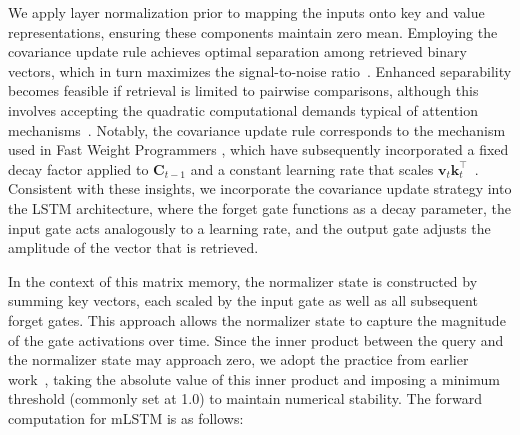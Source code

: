 We apply layer normalization prior to mapping the inputs onto key and value representations, ensuring these components maintain zero mean. Employing the covariance update rule achieves optimal separation among retrieved binary vectors, which in turn maximizes the signal-to-noise ratio~\citep{Dayan:91}. Enhanced separability becomes feasible if retrieval is limited to pairwise comparisons, although this involves accepting the quadratic computational demands typical of attention mechanisms~\citep{Krotov:16,Krotov:17,Ramsauer:21}. Notably, the covariance update rule corresponds to the mechanism used in Fast Weight Programmers \citep{Schmidhuber:92ncfastweights,Schlag:21}, which have subsequently incorporated a fixed decay factor applied to $\mathbf{C}_{t-1}$ and a constant learning rate that scales $\mathbf{v}_{t} \mathbf{k}_t ^\top$~\citep{Ba:16}. Consistent with these insights, we incorporate the covariance update strategy into the LSTM architecture, where the forget gate functions as a decay parameter, the input gate acts analogously to a learning rate, and the output gate adjusts the amplitude of the vector that is retrieved.

In the context of this matrix memory, the normalizer state is constructed by summing key vectors, each scaled by the input gate as well as all subsequent forget gates. This approach allows the normalizer state to capture the magnitude of the gate activations over time. Since the inner product between the query and the normalizer state may approach zero, we adopt the practice from earlier work~\citep{Sun:23arxiv}, taking the absolute value of this inner product and imposing a minimum threshold (commonly set at 1.0) to maintain numerical stability. The forward computation for mLSTM is as follows:

